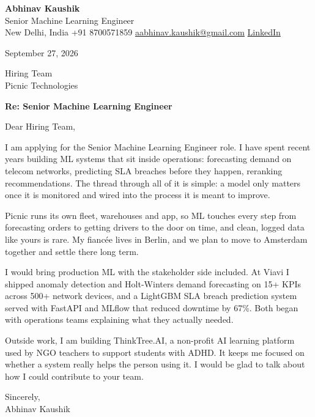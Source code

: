 \documentclass[11pt,a4paper]{article}
\begin{document}
{\Large\bfseries Abhinav Kaushik}\\
Senior Machine Learning Engineer\\
New Delhi, India \textbar{} +91 8700571859 \textbar{} \href{mailto:aabhinav.kaushik@gmail.com}{aabhinav.kaushik@gmail.com} \textbar{} \href{https://www.linkedin.com/in/abhinav-kaushik10/}{LinkedIn}  

September 27, 2026

Hiring Team\\
Picnic Technologies

\textbf{Re: Senior Machine Learning Engineer}

Dear Hiring Team,

I am applying for the Senior Machine Learning Engineer role. I have spent recent years building ML systems that sit inside operations: forecasting demand on telecom networks, predicting SLA breaches before they happen, reranking recommendations. The thread through all of it is simple: a model only matters once it is monitored and wired into the process it is meant to improve.

Picnic runs its own fleet, warehouses and app, so ML touches every step from forecasting orders to getting drivers to the door on time, and clean, logged data like yours is rare. My fiancée lives in Berlin, and we plan to move to Amsterdam together and settle there long term.

I would bring production ML with the stakeholder side included. At Viavi I shipped anomaly detection and Holt-Winters demand forecasting on 15+ KPIs across 500+ network devices, and a LightGBM SLA breach prediction system served with FastAPI and MLflow that reduced downtime by 67\%. Both began with operations teams explaining what they actually needed.

Outside work, I am building ThinkTree.AI, a non-profit AI learning platform used by NGO teachers to support students with ADHD. It keeps me focused on whether a system really helps the person using it. I would be glad to talk about how I could contribute to your team.

Sincerely,\\[4pt]
Abhinav Kaushik
\end{document}
